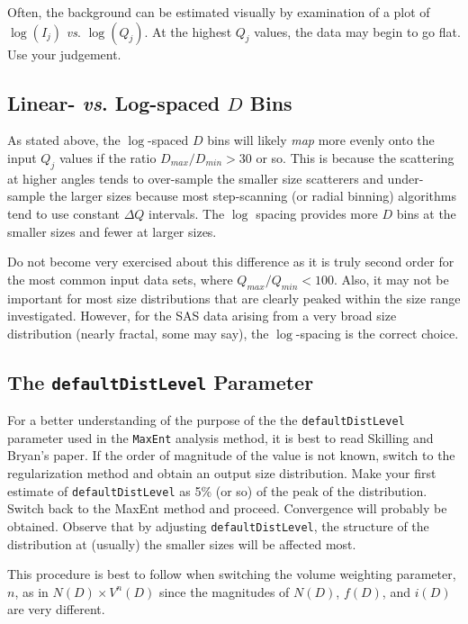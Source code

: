 \documentclass[letterpaper]{article}
\begin{document}
Often, the background can be estimated visually by 
examination of a plot of $\log(I_j)$ \emph{vs}. $\log(Q_j)$.
At the highest $Q_j$ values, the data may begin to go flat.
Use your judgement.

\subsection{Linear- \emph{vs}. Log-spaced $D$ Bins}

As stated above, the $\log$-spaced $D$ bins will likely 
\emph{map} more evenly onto the input $Q_j$ values if the 
ratio $D_{max}/D_{min} > 30$ or so.  This is because the 
scattering at higher angles tends to over-sample the 
smaller size scatterers and under-sample the larger sizes
because most step-scanning (or 
radial binning) algorithms tend to use constant $\Delta Q$ 
intervals.  The $\log$ spacing provides more $D$ bins at 
the smaller sizes and fewer at larger sizes.

Do not become very exercised about this difference as it 
is truly second order for the most common input data sets, 
where $Q_{max}/Q_{min} < 100$.  Also, it may not be 
important for most size distributions that are clearly 
peaked within the size range investigated.  However, for 
the SAS data arising from a very broad size distribution 
(nearly fractal, some may say), the $\log$-spacing is the 
correct choice.

\subsection{The \texttt{defaultDistLevel} Parameter}

For a better understanding of the purpose of the
the \texttt{defaultDistLevel} parameter used in
the \texttt{MaxEnt} analysis method, it is best to read
Skilling and Bryan's paper.  If the order of magnitude of 
the value is not known, switch to the regularization 
method and obtain an output size distribution.  Make your 
first estimate of \texttt{defaultDistLevel} as 5\% (or so) of the 
peak of the distribution.  Switch back to the MaxEnt 
method and proceed.  Convergence will probably be 
obtained.  Observe that by adjusting 
\texttt{defaultDistLevel}, the structure of the 
distribution at (usually) the 
smaller sizes will be affected most.

This procedure is best to follow when switching the 
volume weighting parameter, $n$, as in $N(D) \times V^n(D)$
since the magnitudes of $N(D)$, $f(D)$, and $i(D)$ are 
very different.
\end{document}
